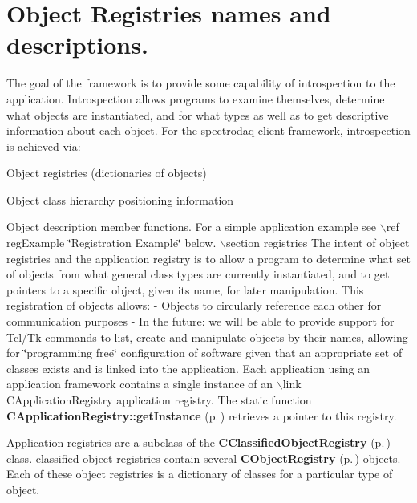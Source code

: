 \section{Object Registries names and descriptions.}\label{Registration}


The goal of the framework is to provide some capability of introspection to the application. Introspection allows programs to examine themselves, determine what objects are instantiated, and for what types as well as to get descriptive information about each object. For the spectrodaq client framework, introspection is achieved via:

\begin{CompactItemize}
\item 
Object registries (dictionaries of objects)\item 
Object class hierarchy positioning information\item 
Object description member functions.  For a simple application example see $\backslash$ref reg\-Example \char`\"{}Registration Example\char`\"{} below.  $\backslash$section registries   The intent of object registries and the application registry is to allow a program to determine what set of objects from what general class types are currently instantiated, and to get pointers to a specific object, given its name, for later manipulation.  This registration of objects allows: - Objects to circularly reference each other for communication purposes - In the future: we will be able to provide support for Tcl/Tk commands   to list, create and manipulate objects by their names, allowing for   \char`\"{}programming free\char`\"{} configuration of software given that an appropriate   set of classes exists and is linked into the application.  Each application using an application framework contains a single instance of an $\backslash$link CApplication\-Registry application registry.  The static function {\bf CApplication\-Registry::get\-Instance} {\rm (p.\,\pageref{classCApplicationRegistry_d0})} retrieves a pointer to this registry.\end{CompactItemize}
Application registries are a subclass of the {\bf CClassified\-Object\-Registry} {\rm (p.\,\pageref{classCClassifiedObjectRegistry})} class. classified object registries contain several {\bf CObject\-Registry} {\rm (p.\,\pageref{classCObjectRegistry})} objects. Each  of these object registries is a dictionary of classes for a particular type of object.

